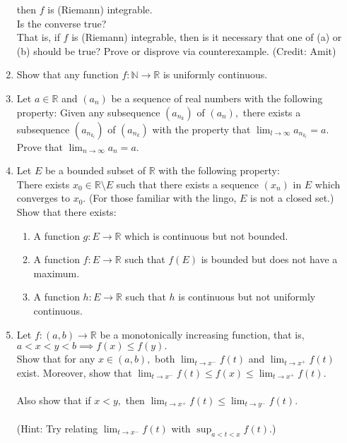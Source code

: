\documentclass{article}
\begin{document}
\begin{enumerate}
	then $f$ is (Riemann) integrable.\\
	Is the converse true?\\
	That is, if $f$ is (Riemann) integrable, then is it necessary that one of (a) or (b) should be true? Prove or disprove via counterexample. \hfill (Credit: Amit)
	\item Show that any function $f:\mathbb{N} \to \mathbb{R}$ is uniformly continuous.
	\item Let $a \in \mathbb{R}$ and $(a_n)$ be a sequence of real numbers with the following property: Given any subsequence $\left(a_{n_k}\right)$ of $(a_n),$ there exists a subsequence $\left(a_{n_{k_l}}\right)$ of $\left(a_{n_k}\right)$ with the property that $\displaystyle\lim_{l\to \infty}a_{n_{k_l}}	= a.$\\
	Prove that $\displaystyle\lim_{n\to \infty}a_n = a.$
	\item Let $E$ be a bounded subset of $\mathbb{R}$ with the following property:\\
	There exists $x_0 \in \mathbb{R}\setminus E$ such that there exists a sequence $(x_n)$ in $E$ which converges to $x_0.$ (For those familiar with the lingo, $E$ is not a closed set.)\\
	Show that there exists:
	\begin{enumerate}[nosep] 
		\item A function $g:E\to \mathbb{R}$ which is continuous but not bounded.
		\item A function $f:E\to \mathbb{R}$ such that $f(E)$ is bounded but does not have a maximum.
		\item A function $h:E\to \mathbb{R}$ such that $h$ is continuous but not uniformly continuous.
	\end{enumerate}
	\item Let $f:(a, b) \to \mathbb{R}$ be a monotonically increasing function, that is, $a < x < y < b \implies f(x) \le f(y).$\\
	Show that for any $x \in (a, b),$ both $\displaystyle\lim_{t\to x^-}f(t)$ and $\displaystyle\lim_{t\to x^+}f(t)$ exist. Moreover, show that $\displaystyle\lim_{t\to x^-}f(t) \le f(x) \le \displaystyle\lim_{t\to x^+}f(t).$\\~\\
	Also show that if $x < y,$ then $\displaystyle\lim_{t\to x^+}f(t) \le \displaystyle \lim_{t\to y^-}f(t).$\\~\\
	(Hint: Try relating $\displaystyle\lim_{t\to x^-}f(t)$ with $\displaystyle\sup_{a < t < x}f(t).$)

\end{enumerate}
\end{document}
